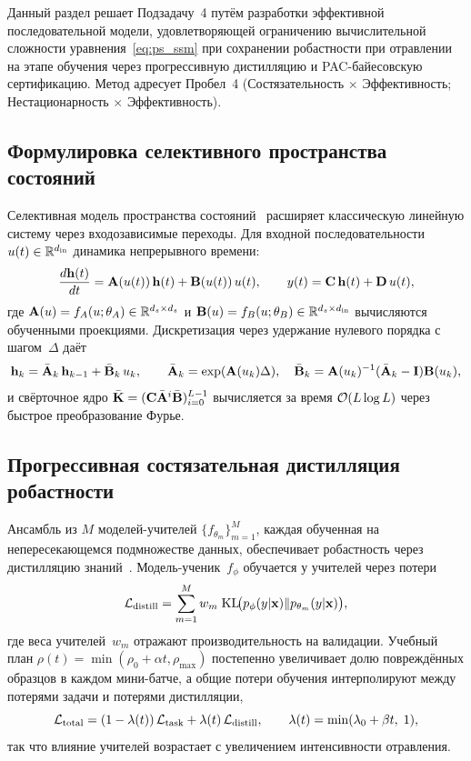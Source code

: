 Данный раздел решает Подзадачу~4 путём разработки эффективной последовательной модели, удовлетворяющей ограничению вычислительной сложности уравнения~\eqref{eq:ps_ssm} при сохранении робастности при отравлении на этапе обучения через прогрессивную дистилляцию и PAC-байесовскую сертификацию. Метод адресует Пробел~4 (Состязательность $\times$ Эффективность; Нестационарность $\times$ Эффективность).

\subsection{Формулировка селективного пространства состояний}

Селективная модель пространства состояний~\cite{Gu2022,Gu2024} расширяет классическую линейную систему через входозависимые переходы. Для входной последовательности $u(t)\in\mathbb{R}^{d_{\mathrm{in}}}$ динамика непрерывного времени:
\begin{equation}
\frac{d\mathbf{h}(t)}{dt} = \mathbf{A}(u(t))\,\mathbf{h}(t) + \mathbf{B}(u(t))\,u(t),
\qquad
y(t) = \mathbf{C}\,\mathbf{h}(t) + \mathbf{D}\,u(t),
\label{eq:mamba_cts}
\end{equation}
где $\mathbf{A}(u)=f_A(u;\theta_A)\in\mathbb{R}^{d_s\times d_s}$ и $\mathbf{B}(u)=f_B(u;\theta_B)\in\mathbb{R}^{d_s\times d_{\mathrm{in}}}$ вычисляются обученными проекциями. Дискретизация через удержание нулевого порядка с шагом~$\Delta$ даёт
\begin{equation}
\mathbf{h}_k = \bar{\mathbf{A}}_k\,\mathbf{h}_{k-1} + \bar{\mathbf{B}}_k\,u_k,
\qquad
\bar{\mathbf{A}}_k = \exp(\mathbf{A}(u_k)\Delta),
\quad
\bar{\mathbf{B}}_k = \mathbf{A}(u_k)^{-1}(\bar{\mathbf{A}}_k - \mathbf{I})\mathbf{B}(u_k),
\label{eq:mamba_disc}
\end{equation}
и свёрточное ядро $\bar{\mathbf{K}}=(\mathbf{C}\bar{\mathbf{A}}^i\bar{\mathbf{B}})_{i=0}^{L-1}$ вычисляется за время $\mathcal{O}(L\log L)$ через быстрое преобразование Фурье.

\subsection{Прогрессивная состязательная дистилляция робастности}

Ансамбль из $M$ моделей-учителей $\{f_{\theta_m}\}_{m=1}^M$, каждая обученная на непересекающемся подмножестве данных, обеспечивает робастность через дистилляцию знаний~\cite{Hinton2015,Xie2019}. Модель-ученик~$f_\phi$ обучается у учителей через потери
\begin{equation}
\mathcal{L}_{\mathrm{distill}}
= \sum_{m=1}^{M}w_m\;\mathrm{KL}\!\bigl(p_\phi(y|\mathbf{x})\|p_{\theta_m}(y|\mathbf{x})\bigr),
\label{eq:mamba_distill}
\end{equation}
где веса учителей~$w_m$ отражают производительность на валидации. Учебный план $\rho(t)=\min(\rho_0+\alpha t,\rho_{\max})$ постепенно увеличивает долю повреждённых образцов в каждом мини-батче, а общие потери обучения интерполируют между потерями задачи и потерями дистилляции,
\begin{equation}
\mathcal{L}_{\mathrm{total}}
= (1-\lambda(t))\,\mathcal{L}_{\mathrm{task}}
+ \lambda(t)\,\mathcal{L}_{\mathrm{distill}},
\qquad
\lambda(t) = \min(\lambda_0+\beta t,\;1),
\label{eq:mamba_curriculum}
\end{equation}
так что влияние учителей возрастает с увеличением интенсивности отравления.

